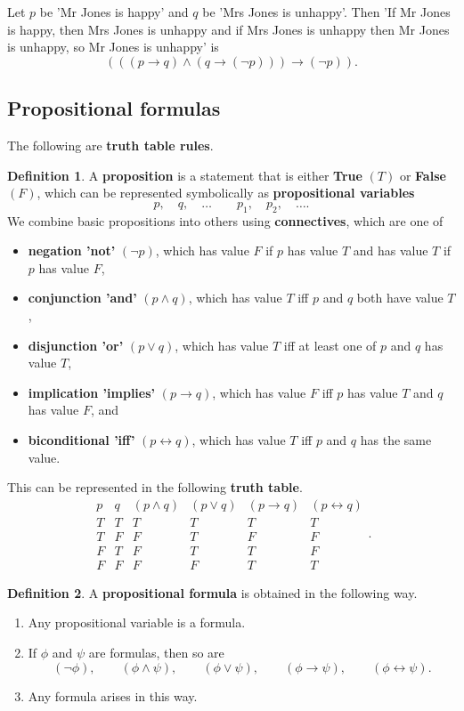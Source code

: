 \documentclass{article}
\newcommand{\rb}[1]{\left( #1 \right)}
\newcommand{\notb}[1]{\rb{\neg #1}}
\newcommand{\orb}[2]{\rb{#1 \lor #2}}
\newcommand{\andb}[2]{\rb{#1 \land #2}}
\newcommand{\impb}[2]{\rb{#1 \rightarrow #2}}
\newcommand{\iffb}[2]{\rb{#1 \leftrightarrow #2}}
\theoremstyle{definition}\newtheorem{definition}{Definition}[subsection]
\theoremstyle{definition}\newtheorem{remark}[definition]{Remark}
\theoremstyle{definition}\newtheorem*{example}{Example}
\theoremstyle{definition}\newtheorem*{note}{Note}
\begin{document}
Let $ p $ be 'Mr Jones is happy' and $ q $ be 'Mrs Jones is unhappy'. Then 'If Mr Jones is happy, then Mrs Jones is unhappy and if Mrs Jones is unhappy then Mr Jones is unhappy, so Mr Jones is unhappy' is
$$ \impb{\andb{\impb{p}{q}}{\impb{q}{\notb{p}}}}{\notb{p}}. $$

\subsection{Propositional formulas}

The following are \textbf{truth table rules}.

\begin{definition}
\label{def:1.1.1}
A \textbf{proposition} is a statement that is either \textbf{True} $ \rb{T} $ or \textbf{False} $ \rb{F} $, which can be represented symbolically as \textbf{propositional variables}
$$ p, \quad q, \quad \dots \qquad p_1, \quad p_2, \quad \dots. $$
We combine basic propositions into others using \textbf{connectives}, which are one of
\begin{itemize}
\item \textbf{negation 'not'} $ \notb{p} $, which has value $ F $ if $ p $ has value $ T $ and has value $ T $ if $ p $ has value $ F $,
\item \textbf{conjunction 'and'} $ \andb{p}{q} $, which has value $ T $ iff $ p $ and $ q $ both have value $ T $,
\item \textbf{disjunction 'or'} $ \orb{p}{q} $, which has value $ T $ iff at least one of $ p $ and $ q $ has value $ T $,
\item \textbf{implication 'implies'} $ \impb{p}{q} $, which has value $ F $ iff $ p $ has value $ T $ and $ q $ has value $ F $, and
\item \textbf{biconditional 'iff'} $ \iffb{p}{q} $, which has value $ T $ iff $ p $ and $ q $ has the same value.
\end{itemize}
This can be represented in the following \textbf{truth table}.
$$
\begin{array}{cc|cccc}
p & q & \andb{p}{q} & \orb{p}{q} & \impb{p}{q} & \iffb{p}{q} \\
\hline
T & T & T & T & T & T \\
T & F & F & T & F & F \\
F & T & F & T & T & F \\
F & F & F & F & T & T
\end{array}.
$$
\end{definition}

\begin{definition}
\label{def:1.1.2}
A \textbf{propositional formula} is obtained in the following way.
\begin{enumerate}
\item Any propositional variable is a formula.
\item If $ \phi $ and $ \psi $ are formulas, then so are
$$ \notb{\phi}, \qquad \andb{\phi}{\psi}, \qquad \orb{\phi}{\psi}, \qquad \impb{\phi}{\psi}, \qquad \iffb{\phi}{\psi}. $$
\item Any formula arises in this way.
\end{enumerate}
\end{definition}
\end{document}
